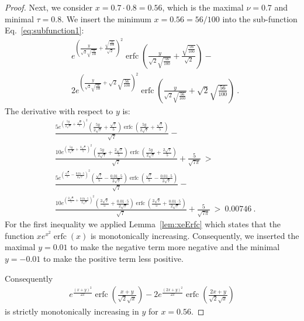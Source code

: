 \documentclass{article}
\DeclareMathOperator{\erfc}{erfc}
\begin{document}
\begin{proof}
Next, we consider $x=0.7 \cdot 0.8=0.56$, which is the maximal $\nu=0.7$
and minimal $\tau=0.8$.
We insert the minimum $x=0.56=56/100$ into the  sub-function
Eq.~\eqref{eq:subfunction1}:
\begin{align}
&e^{\left(\frac{y}{\sqrt{2} \sqrt{\frac{56}{100}}}+\frac{\sqrt{\frac{56}{100}}}{\sqrt{2}}\right)^2} \erfc \left(\frac{y}{\sqrt{2} \sqrt{\frac{56}{100}}}+\frac{\sqrt{\frac{56}{100}}}{\sqrt{2}}\right)-\\ \nonumber &2 e^{\left(\frac{y}{\sqrt{2} \sqrt{\frac{56}{100}}}+\sqrt{2} \sqrt{\frac{56}{100}}\right)^2} \erfc \left(\frac{y}{\sqrt{2} \sqrt{\frac{56}{100}}}+\sqrt{2} \sqrt{\frac{56}{100}}\right)\ .
\end{align}
The derivative with respect to $y$ is:
\begin{align}
&\frac{5 e^{\left(\frac{5 y}{2 \sqrt{7}}+\frac{\sqrt{7}}{5}\right)^2} \left(\frac{5 y}{2 \sqrt{7}}+\frac{\sqrt{7}}{5}\right) \erfc \left(\frac{5 y}{2 \sqrt{7}}+\frac{\sqrt{7}}{5}\right)}{\sqrt{7}}-\\ \nonumber &\frac{10 e^{\left(\frac{5 y}{2 \sqrt{7}}+\frac{2 \sqrt{7}}{5}\right)^2} \left(\frac{5 y}{2 \sqrt{7}}+\frac{2 \sqrt{7}}{5}\right) \erfc \left(\frac{5 y}{2 \sqrt{7}}+\frac{2 \sqrt{7}}{5}\right)}{\sqrt{7}}+\frac{5}{\sqrt{7 \pi }}\ > \ \\ \nonumber &
\frac{5 e^{\left(\frac{\sqrt{7}}{5}-\frac{0.01 \cdot 5}{2 \sqrt{7}}\right)^2} \left(\frac{\sqrt{7}}{5}-\frac{0.01 \cdot 5}{2 \sqrt{7}}\right) \erfc \left(\frac{\sqrt{7}}{5}-\frac{0.01 \cdot 5}{2 \sqrt{7}}\right)}{\sqrt{7}}-\\ \nonumber &\frac{10 e^{\left(\frac{2 \sqrt{7}}{5}+\frac{0.01 \cdot 5}{2 \sqrt{7}}\right)^2} \left(\frac{2 \sqrt{7}}{5}+\frac{0.01 \cdot 5}{2 \sqrt{7}}\right) \erfc \left(\frac{2 \sqrt{7}}{5}+\frac{0.01 \cdot 5}{2 \sqrt{7}}\right)}{\sqrt{7}}+\frac{5}{\sqrt{7 \pi }}\ > \ 0.00746 \ .
\end{align}
For the first inequality we applied Lemma~\ref{lem:xeErfc}
which states that the function $x e^{x^2} \erfc (x)$ is
monotonically increasing.
Consequently, we inserted the maximal $y=0.01$ to
make the negative term more negative and the minimal $y=-0.01$
to make the positive term less positive.

Consequently 
\begin{align}
e^{\frac{(x+y)^2}{2 x}} \erfc \left(\frac{x+y}{\sqrt{2} \sqrt{x}}\right)-2 e^{\frac{(2 x+y)^2}{2 x}} \erfc \left(\frac{2 x+y}{\sqrt{2} \sqrt{x}}\right)
\end{align}
is strictly monotonically increasing in $y$ for $x=0.56$. 



\end{proof}
\end{document}
